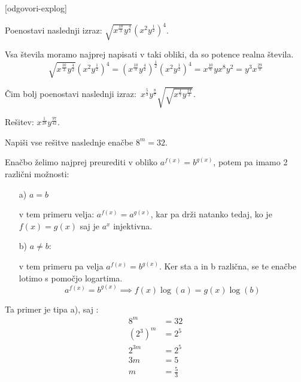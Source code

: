 
\def\datotekaOdgovori{odgovori-explog}

[\datotekaOdgovori]

%

\begin{vaja}
 Poenostavi naslednji izraz: \(\sqrt{x^{\frac{10}{3}}y^{\frac{4}{2}}}(x^{2}y^{\frac{1}{2}})^{4}\).

  \begin{odgovor}
   Vsa števila moramo najprej napisati v taki obliki, da so potence realna števila. 
	$$\sqrt{x^{\frac{10}{3}}y^{\frac{4}{2}}}(x^{2}y^{\frac{1}{2}})^{4}=(x^{\frac{10}{3}}y^{\frac{4}{2}})^{\frac{1}{2}}(x^{2}y^{\frac{1}{2}})^{4}=x^{\frac{10}{6}}yx^{8}y^{2}=y^{3}x^{\frac{29}{3}}$$
  \end{odgovor}
\end{vaja}

\begin{vaja}
  Čim bolj poenostavi naslednji izraz: \(\,x^{\frac{5}{3}}y^{\frac{8}{7}}\sqrt{\sqrt{x^{\frac{1}{7}}y^{\frac{14}{3}}}}\).

  \begin{odgovor}
   Rešitev: $x^{\frac{1}{28}} y^{\frac{97}{42}}$.
  \end{odgovor}
\end{vaja}

\begin{vaja}
  Napiši vse rešitve naslednje enačbe \( 8^m=32\).

  \begin{odgovor}
   Enačbo želimo najprej  preurediti v obliko $a^{f(x)}=b^{g(x)}$, potem pa imamo 2 različni možnosti:
	\begin{itemize}
		\item[a)] $a=b$ 

			v tem primeru velja: $a^{f(x)}=a^{g(x)}$, kar pa drži natanko tedaj, ko je $f(x)=g(x)$ saj je $a^x$ injektivna.
			
		\item[b)] $a\neq b$:
			
			v tem primeru pa velja $a^{f(x)}=b^{g(x)}$. Ker sta a in b različna, se te enačbe lotimo s pomočjo logartima.
			$$a^{f(x)}=b^{g(x)}\implies f(x)\log(a)=g(x)\log(b)$$
	\end{itemize}
	
	Ta primer je tipa a), saj :
	\begin{align*}
		8^m&=32\\
		(2^3)^m&=2^5\\
		2^{3m}&=2^5\\
		3m&=5\\
		m&=\frac{5}{3}
	\end{align*}
  \end{odgovor}
\end{vaja}


